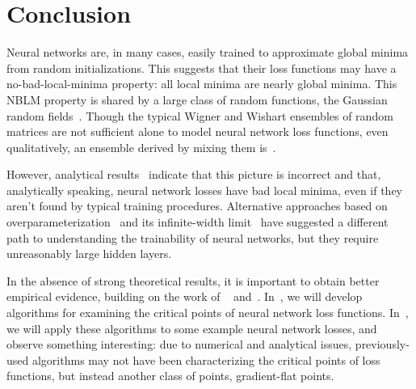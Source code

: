 \documentclass[../../thesis.tex]{subfiles}
\begin{document}
\section{Conclusion}

Neural networks are, in many cases,
easily trained to approximate global minima
from random initializations.
This suggests that their loss functions may have
a no-bad-local-minima property:
all local minima are nearly global minima.
This NBLM property is shared by a large class of random functions,
the Gaussian random fields~\cite{bray2007,dauphin2014}.
Though the typical Wigner and Wishart ensembles of random matrices
are not sufficient alone to model neural network loss functions,
even qualitatively,
an ensemble derived by mixing them is~\cite{pennington2017}.

However, analytical results~\cite{ding2019}
indicate that this picture is incorrect
and that, analytically speaking,
neural network losses have bad local minima,
even if they aren't found by typical training procedures.
Alternative approaches based on
overparameterization~\cite{allenzhu2018}
and its infinite-width limit~\cite{jacot2018}
have suggested a different path to understanding
the trainability of neural networks,
but they require unreasonably large hidden layers.

In the absence of strong theoretical results,
it is important to obtain better empirical evidence,
building on the work of%
~\cite{dauphin2014} and~\cite{pennington2017}.
In~,
we will develop algorithms for examining
the critical points of neural network loss functions.
In~,
we will apply these algorithms to some example
neural network losses,
and observe something interesting:
due to numerical and analytical issues,
previously-used algorithms may not have
been characterizing the critical points of loss functions,
but instead another class of points,
gradient-flat points.
\end{document}
